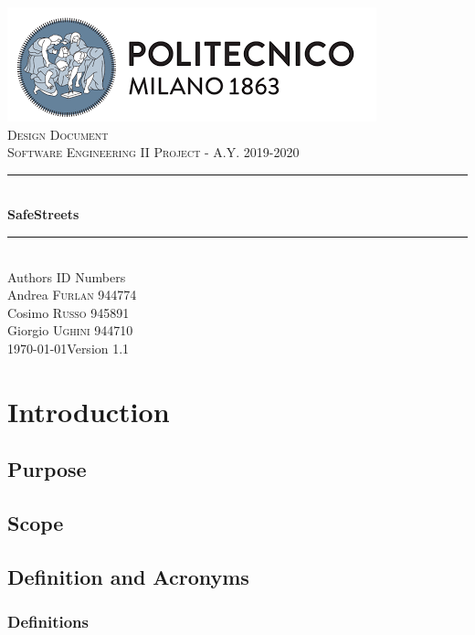 \documentclass[12pt]{article}
\begin{document}
	\begin{titlepage}
		\newcommand{\HRule}{\rule{\linewidth}{0.7mm}}
		\center
		\includegraphics[width=\textwidth]{PolimiLogo.png}\\[1cm]
		
		\textsc{\LARGE Design Document}\\[1cm]
		\textsc{\large Software Engineering II Project - A.Y. 2019-2020}\\[1cm]
		\HRule \\[0.4cm]
		{ \huge \bfseries SafeStreets}\\[0.15cm]
		\HRule \\[1.5cm]
		{\large Authors  \hfill ID Numbers}\\[0.4cm]
		{\large Andrea \textsc{Furlan}  \hfill 944774}\\[0.2cm]
		{\large Cosimo \textsc{Russo}  \hfill 945891}\\[0.2cm]
		{\large Giorgio \textsc{Ughini} \hfill 944710}\\[2cm]
		{\large \today  \hfill Version 1.1}
		\vfill
	\end{titlepage}
\clearpage

{\hypersetup{hidelinks}\tableofcontents}
\clearpage
\setlength{\parskip}{1em}
\section{Introduction}
\subsection{Purpose}


\subsection{Scope}


\subsection{Definition and Acronyms}
\subsubsection{Definitions}

\clearpage
\end{document}
